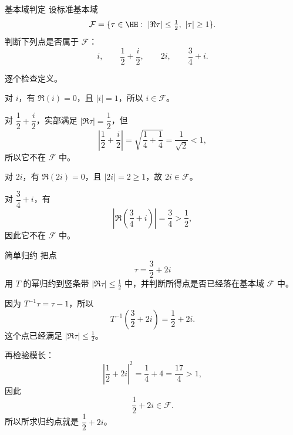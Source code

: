\begin{problem}{基本域判定}
\easy
设标准基本域
\[
\mathcal{F}=\{\tau\in \HH:\ |\Re\tau|\leq \tfrac12,\ |\tau|\geq 1\}.
\]
判断下列点是否属于 $\mathcal{F}$：
\[
i,\qquad \frac12+\frac{i}{2},\qquad 2i,\qquad \frac34+i.
\]
\end{problem}
\begin{solution}
逐个检查定义。

对 $i$，有 $\Re(i)=0$，且 $|i|=1$，所以 $i\in\mathcal{F}$。

对 $\dfrac12+\dfrac{i}{2}$，实部满足 $\left|\Re\tau\right|=\dfrac12$，但
\[
\left|\frac12+\frac{i}{2}\right|=\sqrt{\frac14+\frac14}=\frac{1}{\sqrt2}<1,
\]
所以它不在 $\mathcal{F}$ 中。

对 $2i$，有 $\Re(2i)=0$，且 $|2i|=2\ge 1$，故 $2i\in\mathcal{F}$。

对 $\dfrac34+i$，有
\[
\left|\Re\left(\frac34+i\right)\right|=\frac34>\frac12,
\]
因此它不在 $\mathcal{F}$ 中。
\end{solution}

\begin{problem}{简单归约}
\easy
把点
\[
\tau=\frac32+2i
\]
用 $T$ 的幂归约到竖条带 $|\Re\tau|\leq \tfrac12$ 中，并判断所得点是否已经落在基本域 $\mathcal{F}$ 中。
\end{problem}
\begin{solution}
因为 $T^{-1}\tau=\tau-1$，所以
\[
T^{-1}\left(\frac32+2i\right)=\frac12+2i.
\]
这个点已经满足 $|\Re\tau|\leq \tfrac12$。

再检验模长：
\[
\left|\frac12+2i\right|^2=\frac14+4=\frac{17}{4}>1,
\]
因此
\[
\frac12+2i\in \mathcal{F}.
\]
所以所求归约点就是 $\dfrac12+2i$。
\end{solution}

